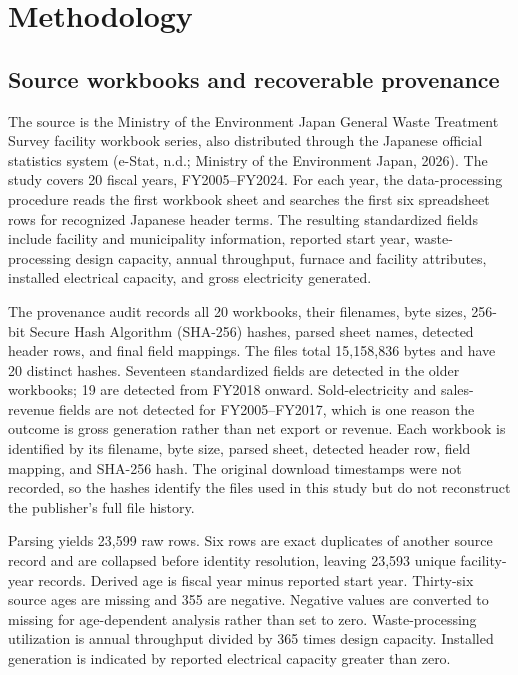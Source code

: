 \documentclass[12pt,letterpaper]{article}
\begin{document}
\section{Methodology}

\subsection{Source workbooks and recoverable provenance}

The source is the Ministry of the Environment Japan General Waste Treatment
Survey facility workbook series, also distributed through the Japanese official
statistics system (e-Stat, n.d.; Ministry of the Environment Japan, 2026). The
study covers 20 fiscal years, FY2005--FY2024. For each year, the data-processing procedure
reads the first workbook sheet and searches the first six spreadsheet rows for
recognized Japanese header terms. The resulting standardized fields include
facility and municipality information, reported start year, waste-processing
design capacity, annual throughput, furnace and facility attributes, installed
electrical capacity, and gross electricity generated.

The provenance audit records all 20 workbooks, their filenames, byte sizes,
256-bit Secure Hash Algorithm (SHA-256) hashes, parsed sheet names, detected
header rows, and final field
mappings. The files total 15,158,836 bytes and have 20 distinct hashes.
Seventeen standardized fields are detected in the older workbooks; 19 are
detected from FY2018 onward. Sold-electricity and sales-revenue fields are not
detected for FY2005--FY2017, which is one reason the outcome is gross generation
rather than net export or revenue. Each workbook is identified by its filename, byte size, parsed sheet, detected header row, field mapping, and SHA-256 hash. The original download timestamps were not recorded, so the hashes identify the files used in this study but do not reconstruct the publisher's full file history.

Parsing yields 23,599 raw rows. Six rows are exact duplicates of another source
record and are collapsed before identity resolution, leaving 23,593 unique
facility-year records. Derived age is fiscal year minus reported start year.
Thirty-six source ages are missing and 355 are negative. Negative values are
converted to missing for age-dependent analysis rather than set to zero.
Waste-processing utilization is annual throughput divided by 365 times design
capacity. Installed generation is indicated by reported electrical capacity
greater than zero.
\end{document}
